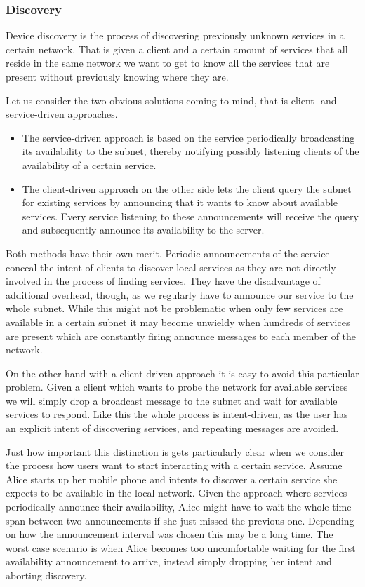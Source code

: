 \subsubsection{Discovery}
\label{sec:discovery}

Device discovery is the process of discovering previously unknown services in a certain network.
That is given a client and a certain amount of services that all reside in the same network we want to get to know all the services that are present without previously knowing where they are.

Let us consider the two obvious solutions coming to mind, that is client- and service-driven approaches.
\begin{itemize}
    \item The service-driven approach is based on the service periodically broadcasting its availability to the subnet, thereby notifying possibly listening clients of the availability of a certain service.
    \item The client-driven approach on the other side lets the client query the subnet for existing services by announcing that it wants to know about available services.
        Every service listening to these announcements will receive the query and subsequently announce its availability to the server.
\end{itemize}

Both methods have their own merit.
Periodic announcements of the service conceal the intent of clients to discover local services as they are not directly involved in the process of finding services.
They have the disadvantage of additional overhead, though, as we regularly have to announce our service to the whole subnet.
While this might not be problematic when only few services are available in a certain subnet it may become unwieldy when hundreds of services are present which are constantly firing announce messages to each member of the network.

On the other hand with a client-driven approach it is easy to avoid this particular problem.
Given a client which wants to probe the network for available services we will simply drop a broadcast message to the subnet and wait for available services to respond.
Like this the whole process is intent-driven, as the user has an explicit intent of discovering services, and repeating messages are avoided.

Just how important this distinction is gets particularly clear when we consider the process how users want to start interacting with a certain service.
Assume Alice starts up her mobile phone and intents to discover a certain service she expects to be available in the local network.
Given the approach where services periodically announce their availability, Alice might have to wait the whole time span between two announcements if she just missed the previous one.
Depending on how the announcement interval was chosen this may be a long time.
The worst case scenario is when Alice becomes too uncomfortable waiting for the first availability announcement to arrive, instead simply dropping her intent and aborting discovery.

